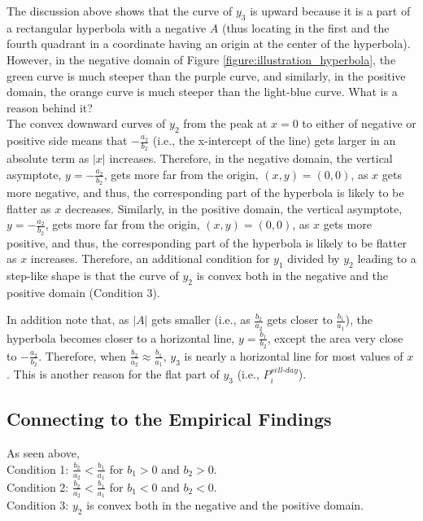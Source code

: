 \documentclass[11pt, a4paper]{article}
\begin{document}
\noindent
The discussion above shows that the curve of $y_3$ is upward because it is a part of a rectangular hyperbola with a negative $A$ (thus locating in the first and the fourth quadrant in a coordinate having an origin at the center of the hyperbola). However, in the negative domain of Figure \ref{figure:illustration_hyperbola}, the green curve is much steeper than the purple curve, and similarly, in the positive domain, the orange curve is much steeper than the light-blue curve. What is a reason behind it?\\

\noindent
The convex downward curves of $y_2$ from the peak at $x=0$ to either of negative or positive side means that $-\frac{a_2}{b_2}$ (i.e., the x-intercept of the line) gets larger in an absolute term as $|x|$ increases. Therefore, in the negative domain, the vertical asymptote, $y=-\frac{a_2}{b_2}$, gets more far from the origin, $(x, y)=(0, 0)$, as $x$ gets more negative, and thus, the corresponding part of the hyperbola is likely to be flatter as $x$ decreases. Similarly, in the positive domain, the vertical asymptote, $y=-\frac{a_2}{b_2}$, gets more far from the origin, $(x, y)=(0, 0)$, as $x$ gets more positive, and thus, the corresponding part of the hyperbola is likely to be flatter as $x$ increases.   
Therefore, an additional condition for $y_1$ divided by $y_2$ leading to a step-like shape is that the curve of $y_2$ is convex both in the negative and the positive domain (Condition 3).

In addition note that, as $|A|$ gets smaller (i.e., as $\frac{b_2}{a_2}$ gets closer to $\frac{b_1}{a_1}$), the hyperbola becomes closer to a horizontal line, $y=\frac{b_1}{b_2}$, except the area very close to $-\frac{a_2}{b_2}$. Therefore, when $\frac{b_2}{a_2} \approx \frac{b_1}{a_1}$, $y_3$ is nearly a horizontal line for most values of $x$. This is another reason for the flat part of $y_3$ (i.e., $P^{sell\mbox{-}day}_{i}$). 


\subsection{Connecting to the Empirical Findings}
\label{section:emp_cond}
\noindent
As seen above,\\
Condition 1: $\frac{b_2}{a_2} < \frac{b_1}{a_1}$ for $b_1>0$ and $b_2>0$.\\
Condition 2: $\frac{b_2}{a_2} < \frac{b_1}{a_1}$ for $b_1<0$ and $b_2<0$.\\
Condition 3: $y_2$ is convex both in the negative and the positive domain.\\
\end{document}
